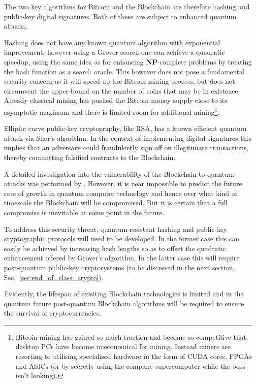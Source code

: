 The two key algorithms for Bitcoin and the Blockchain are therefore hashing and public-key digital signatures. Both of these are subject to enhanced quantum attacks.

Hashing does not have any known quantum algorithm with exponential improvement, however using a Grover search one can achieve a quadratic speedup, using the same idea as for enhancing \textbf{NP}-complete problems by treating the hash function as a search oracle. This however does not pose a fundamental security concern as it will speed up the Bitcoin mining process, but does not circumvent the upper-bound on the number of coins that may be in existence. Already classical mining has pushed the Bitcoin money supply close to its asymptotic maximum and there is limited room for additional mining\footnote{Bitcoin mining has gained so much traction and become so competitive that desktop PCs have become uneconomical for mining. Instead miners are resorting to utilising specialised hardware in the form of CUDA cores, FPGAs and ASICs (or by secretly using the company supercomputer while the boss isn't looking).}.

Elliptic curve public-key cryptography, like RSA, has a known efficient quantum attack via Shor's algorithm. In the context of implementing digital signatures this implies that an adversary could fraudulently sign off on illegitimate transactions, thereby committing falsified contracts to the Blockchain.

A detailed investigation into the vulnerability of the Blockchain to quantum attacks was performed by \cite{bib:TomamichelBlockchain}. However, it is near impossible to predict the future rate of growth in quantum computer technology and hence over what kind of timescale the Blockchain will be compromised. But it is certain that a full compromise is inevitable at some point in the future.

To address this security threat, quantum-resistant hashing and public-key cryptographic protocols will need to be developed. In the former case this can easily be achieved by increasing hash lengths so as to offset the quadratic enhancement offered by Grover's algorithm. In the latter case this will require post-quantum public-key cryptosystems (to be discussed in the next section, Sec.~\ref{sec:end_of_class_crypto}).

Evidently, the lifespan of exisiting Blockchain technologies is limited and in the quantum future post-quantum Blockchain algorithms will be required to ensure the survival of cryptocurrencies.

